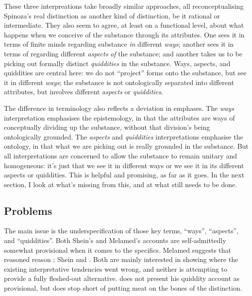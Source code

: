 \documentclass[11pt]{article}
\newcommand{\dash}{\unskip{---}}
\begin{document}
	These three interpreations take broadly similar approaches, all reconceptualising Spinoza's real distinction as another kind of distinction, be it rational or intermediate. They also seem to agree, at least on a functional level, about what happens when we conceive of the substance through its attributes. One sees it in terms of finite minds regarding substance \emph{in} different \emph{ways}; another sees it in terms of regarding different \emph{aspects} \emph{of} the substance; and another takes us to be picking out formally distinct \emph{quiddities} in the substance. Ways, aspects, and quiddities are central here: we do not \enquote{project} forms onto the substance, but see it in different \emph{ways}; the substance is not ontologically separated into different attributes, but involves different \emph{aspects} or \emph{quiddities}.
	
	The difference in terminology also reflects a deviation in emphases. The \emph{ways} interpretation emphasises the epistemology, in that the attributes are ways of conceptually dividing up the substance, without that division's being ontologically grounded. The \emph{aspects} and \emph{quiddities} interpretations emphasise the ontology, in that what we are picking out is really grounded in the substance. But all interpretations are concerned to allow the substance to remain unitary and homogeneous: it’s just that we see it in different ways \dash or we see it in its different aspects or quiddities. This is helpful and promising, as far as it goes. In the next section, I look at what's missing from this, and at what still needs to be done.
	
	\subsection{Problems} \label{subsec:Problems}
	
	The main issue is the underspecification of those key terms, \enquote{ways}, \enquote{aspects}, and \enquote{quiddities}. Both Shein’s and Melamed’s accounts are self-admittedly somewhat provisional when it comes to the specifics. Melamed suggests that reasoned reason ; Shein  and . Both are mainly interested in showing where the existing interpretative tendencies went wrong, and neither is attempting to provide a fully fleshed-out alternative.  does not present his quiddity account as provisional, but does stop short of putting meat on the bones of the distinction.
	
\end{document}
